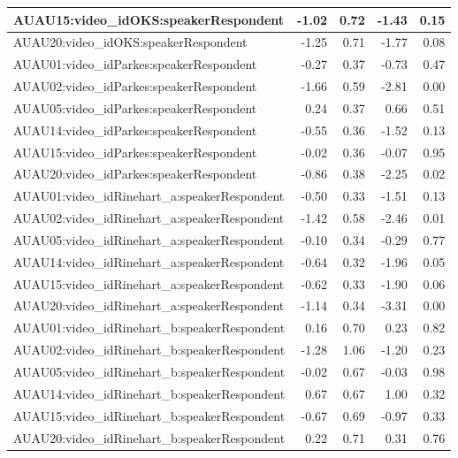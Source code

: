 \documentclass{monashthesis}
\begin{document}
\begin{tabular}{l|r|r|r|r}
\hline
AUAU15:video\_idOKS:speakerRespondent & -1.02 & 0.72 & -1.43 & 0.15\\
\hline
AUAU20:video\_idOKS:speakerRespondent & -1.25 & 0.71 & -1.77 & 0.08\\
\hline
AUAU01:video\_idParkes:speakerRespondent & -0.27 & 0.37 & -0.73 & 0.47\\
\hline
AUAU02:video\_idParkes:speakerRespondent & -1.66 & 0.59 & -2.81 & 0.00\\
\hline
AUAU05:video\_idParkes:speakerRespondent & 0.24 & 0.37 & 0.66 & 0.51\\
\hline
AUAU14:video\_idParkes:speakerRespondent & -0.55 & 0.36 & -1.52 & 0.13\\
\hline
AUAU15:video\_idParkes:speakerRespondent & -0.02 & 0.36 & -0.07 & 0.95\\
\hline
AUAU20:video\_idParkes:speakerRespondent & -0.86 & 0.38 & -2.25 & 0.02\\
\hline
AUAU01:video\_idRinehart\_a:speakerRespondent & -0.50 & 0.33 & -1.51 & 0.13\\
\hline
AUAU02:video\_idRinehart\_a:speakerRespondent & -1.42 & 0.58 & -2.46 & 0.01\\
\hline
AUAU05:video\_idRinehart\_a:speakerRespondent & -0.10 & 0.34 & -0.29 & 0.77\\
\hline
AUAU14:video\_idRinehart\_a:speakerRespondent & -0.64 & 0.32 & -1.96 & 0.05\\
\hline
AUAU15:video\_idRinehart\_a:speakerRespondent & -0.62 & 0.33 & -1.90 & 0.06\\
\hline
AUAU20:video\_idRinehart\_a:speakerRespondent & -1.14 & 0.34 & -3.31 & 0.00\\
\hline
AUAU01:video\_idRinehart\_b:speakerRespondent & 0.16 & 0.70 & 0.23 & 0.82\\
\hline
AUAU02:video\_idRinehart\_b:speakerRespondent & -1.28 & 1.06 & -1.20 & 0.23\\
\hline
AUAU05:video\_idRinehart\_b:speakerRespondent & -0.02 & 0.67 & -0.03 & 0.98\\
\hline
AUAU14:video\_idRinehart\_b:speakerRespondent & 0.67 & 0.67 & 1.00 & 0.32\\
\hline
AUAU15:video\_idRinehart\_b:speakerRespondent & -0.67 & 0.69 & -0.97 & 0.33\\
\hline
AUAU20:video\_idRinehart\_b:speakerRespondent & 0.22 & 0.71 & 0.31 & 0.76\\
\hline
\end{tabular}

\printbibliography[heading=bibintoc]
\end{document}
